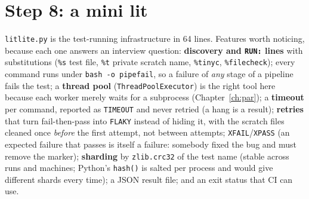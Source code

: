 \documentclass[10pt,a4paper,openany,oneside]{report}
\newcommand{\prio}[1]{\texorpdfstring{\ifcase#1\or{\color{gold}\ding{72}}\or{\color{gold}\ding{72}\ding{72}}\or{\color{gold}\ding{72}\ding{72}\ding{72}}\fi}{}}
\begin{document}
\section{Step 8: a mini lit \prio{3}}
\texttt{litlite.py} is the test-running infrastructure in 64 lines. Features worth noticing, because each one answers an interview question: \textbf{discovery and \texttt{RUN:} lines} with substitutions (\texttt{\%s} test file, \texttt{\%t} private scratch name, \texttt{\%tinyc}, \texttt{\%filecheck}); every command runs under \texttt{bash -o pipefail}, so a failure of \emph{any} stage of a pipeline fails the test; a \textbf{thread pool} (\texttt{ThreadPoolExecutor}) is the right tool here because each worker merely waits for a subprocess (Chapter~\ref{ch:par}); a \textbf{timeout} per command, reported as \texttt{TIMEOUT} and never retried (a hang is a result); \textbf{retries} that turn fail-then-pass into \texttt{FLAKY} instead of hiding it, with the scratch files cleaned once \emph{before} the first attempt, not between attempts; \texttt{XFAIL}/\texttt{XPASS} (an expected failure that passes is itself a failure: somebody fixed the bug and must remove the marker); \textbf{sharding} by \texttt{zlib.crc32} of the test name (stable across runs and machines; Python's \texttt{hash()} is salted per process and would give different shards every time); a JSON result file; and an exit status that CI can use.
\end{document}
